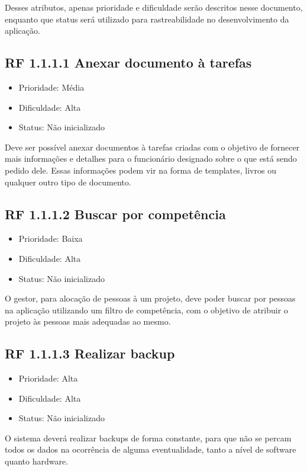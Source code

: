 Desses atributos, apenas prioridade e dificuldade serão descritos nesse documento, enquanto que status será utilizado para rastreabilidade no desenvolvimento da aplicação.


\subsection{RF 1.1.1.1  Anexar documento à tarefas}

\begin{itemize}
  \item{Prioridade: Média}
  \item{Dificuldade: Alta}
  \item{Status: Não inicializado}
\end{itemize}

Deve ser possível anexar documentos à tarefas criadas com o objetivo de fornecer mais informações e detalhes para o funcionário designado sobre o que está sendo pedido dele. Essas informações podem vir na forma de templates, livros ou qualquer outro tipo de documento.


\subsection{RF 1.1.1.2 Buscar por competência}

\begin{itemize}
  \item{Prioridade: Baixa}
  \item{Dificuldade: Alta}
  \item{Status: Não inicializado}
\end{itemize}

O gestor, para alocação de pessoas à um projeto, deve poder buscar por pessoas na aplicação utilizando um filtro de competência, com o objetivo de atribuir o projeto às pessoas mais adequadas ao mesmo.


\subsection{RF 1.1.1.3 Realizar backup}

\begin{itemize}
  \item{Prioridade: Alta}
  \item{Dificuldade: Alta}
  \item{Status: Não inicializado}
\end{itemize}

O sistema deverá realizar backups de forma constante, para que não se percam todos os dados na ocorrência de alguma eventualidade, tanto a nível de software quanto hardware.


